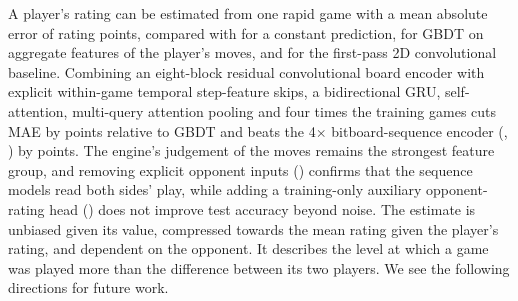 \documentclass[11pt]{article}
\begin{document}
A player's rating can be estimated from one rapid game with a mean absolute
error of  rating points, compared with  for a
constant prediction,  for GBDT on aggregate features of the
player's moves, and  for the first-pass 2D convolutional
baseline. Combining an eight-block residual convolutional board encoder with
explicit within-game temporal step-feature skips, a bidirectional GRU,
self-attention, multi-query attention pooling and four times the training games
cuts MAE by  points relative to GBDT and beats the 4$\times$
bitboard-sequence encoder (,
) by
 points.
The engine's judgement of the moves remains the strongest feature group, and
removing explicit opponent inputs () confirms that the
sequence models read both sides' play, while adding a training-only auxiliary
opponent-rating head () does not improve test accuracy
beyond noise.\iflook{} The estimate is unbiased given its value, compressed
towards the mean rating given the player's rating, and dependent on the
opponent. It describes the level at which a game was played more than the
difference between its two players.\fi{} We see the following directions for
future work.
\end{document}
